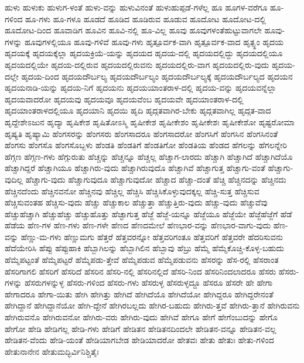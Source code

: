 {ಹುಳು
ಹುಳುಕು
ಹುಳುಗ-ಳಂತೆ
ಹುಳು-ವನ್ನು
ಹುಳುವಿನಂತೆ
ಹುಳುಹುಪ್ಪಡೆ-ಗಳೆಲ್ಲ
ಹೂ
ಹೂಗಳ-ವರೆಗೂ
ಹೂ-ಗಳಿಂದ
ಹೂ-ಗಳು
ಹೂ-ಗಳೂ
ಹೂಡದೆ
ಹೂಡಿದ
ಹೂಡಿರುವ
ಹೂಡುವ
ಹೂದೋಟ
ಹೂದೋಟ-ದಲ್ಲಿ
ಹೂದೋಟ-ದಿಂದ
ಹೂವಾಡಿಗ
ಹೂವಿನ
ಹೂವಿ-ನಲ್ಲಿ
ಹೂ-ವಿಲ್ಲ
ಹೂವು
ಹೂವುಗಳಂತೆಹುಟ್ಟುವಾಗಲೇ
ಹೂವು-ಗಳನ್ನು
ಹೂವುಗಳಲ್ಲಿಯೂ
ಹೂವು-ಗಳಿವೆ
ಹೂವು-ಗಳು
ಹೃತ್ಪೂರ್ವಕ-ವಾಗಿ
ಹೃತ್ಪೂರ್ವಕ-ವಾದ
ಹೃತ್ಸ್ಥಂ
ಹೃದಯ
ಹೃದಯಕ್ಕೆ
ಹೃದಯಕ್ಕೆಲ್ಲಾ
ಹೃದಯಕ್ರಿಯೆ-ಯನ್ನು
ಹೃದಯದ
ಹೃದಯ-ದಲ್ಲಿ
ಹೃದಯದಲ್ಲಿದ್ದು
ಹೃದಯದಲ್ಲಿಯೂ
ಹೃದಯದಲ್ಲಿಯೇ
ಹೃದಯ-ದಲ್ಲಿರುವ
ಹೃದಯದಲ್ಲಿರುವನು
ಹೃದಯದಲ್ಲಿರು-ವಾಗ
ಹೃದಯದಲ್ಲಿರು-ವುದು
ಹೃದಯ-ದಲ್ಲೇ
ಹೃದಯ-ದಿಂದ
ಹೃದಯದೌರ್ಬಲ್ಯ
ಹೃದಯದೌರ್ಬಲ್ಯಂ
ಹೃದಯದೌರ್ಬಲ್ಯಕ್ಕೆ
ಹೃದಯದೌರ್ಬಲ್ಯದ
ಹೃದಯನ
ಹೃದಯನಾಡಿ-ಯನ್ನು
ಹೃದಯ-ನಿಗೆ
ಹೃದಯನು
ಹೃದಯಯಾಂತರಾಳ-ದಲ್ಲಿ
ಹೃದಯ-ವನ್ನು
ಹೃದಯವನ್ನೆಲ್ಲಾ
ಹೃದಯವಾದರೋ
ಹೃದಯವು
ಹೃದಯವೂ
ಹೃದಯವೆಂಬ
ಹೃದಯವೇ
ಹೃದಯಾಂತರಾಳ-ದಲ್ಲಿ
ಹೃದಯಾಂತರಾಳದಲ್ಲಿಯೂ
ಹೃದಯಾನಿ
ಹೃದಯಿ
ಹೃದಿ
ಹೃದ್ಗತವಾಗಿರ-ಬೇಕು
ಹೃದ್ಗತವಾಗಿಲ್ಲ
ಹೃದ್ಗತ-ವಾದ
ಹೃದ್ದೇಶೇಽಜುನ
ಹೃದ್ಯಾ
ಹೃಷಿಕೇಶ
ಹೃಷಿತೋಽಸ್ಮಿ
ಹೃಷೀಕೇಶ
ಹೃಷೀಕೇಶಂ
ಹೃಷೀಕೇಶಃ
ಹೃಷೀಕೇಶೋ
ಹೃಷ್ಟರೋಮಾ
ಹೃಷ್ಯತಿ
ಹೃಷ್ಯಾಮಿ
ಹೆಂಗಸರನ್ನು
ಹೆಂಗಸರು
ಹೆಂಗಸಾದರೂ
ಹೆಂಗಸಾದರೋ
ಹೆಂಗಸಿಗೆ
ಹೆಂಗಸಿನ
ಹೆಂಗಸಿನಂತೆ
ಹೆಂಗಸು
ಹೆಂಗಸೊ
ಹೆಂಗಸೊಬ್ಬಳು
ಹೆಂಡತಿ
ಹೆಂಡತಿಗೆ
ಹೆಂಡತಿಗೋ
ಹೆಂಡತಿಯ
ಹೆಂಡದ
ಹೆಗಲನ್ನು
ಹೆಗಲನ್ನೇರಿ
ಹೆಗ್ಗಣ
ಹೆಗ್ಗಣ-ಗಳು
ಹೆಗ್ಗುರುತು
ಹೆಚ್ಚನ್ನು
ಹೆಚ್ಚನ್ನೂ
ಹೆಚ್ಚಲ್ಲ
ಹೆಚ್ಚಾಗ-ಲಾರದು
ಹೆಚ್ಚಾಗಿ
ಹೆಚ್ಚಾಗಿದೆ
ಹೆಚ್ಚಾಗಿದೆಯೊ
ಹೆಚ್ಚಾಗಿದ್ದರೆ
ಹೆಚ್ಚಾಗಿಯೂ
ಹೆಚ್ಚಾಗಿರು-ವುದು
ಹೆಚ್ಚಾಗಿರುವುದೊ
ಹೆಚ್ಚಾಗಿವೆ
ಹೆಚ್ಚಾಗುತ್ತ
ಹೆಚ್ಚಾಗು-ವಂತೆ
ಹೆಚ್ಚಾಗು-ವುದಿಲ್ಲ
ಹೆಚ್ಚಾಗು-ವುದು
ಹೆಚ್ಚಾಗುವುದೂ
ಹೆಚ್ಚಾಗುವುದೋ
ಹೆಚ್ಚಾದ
ಹೆಚ್ಚಾ-ದಂತೆ
ಹೆಚ್ಚಿ
ಹೆಚ್ಚಿನದನ್ನು
ಹೆಚ್ಚಿನದು
ಹೆಚ್ಚಿನದೆಂದು
ಹೆಚ್ಚಿನವನೋ
ಹೆಚ್ಚಿನವು
ಹೆಚ್ಚಿಲ್ಲ
ಹೆಚ್ಚಿಸಿ
ಹೆಚ್ಚಿಸಿಕೊಳ್ಳುವುದಕ್ಕಲ್ಲ
ಹೆಚ್ಚಿ-ಸುತ್ತ
ಹೆಚ್ಚಿಸುವ
ಹೆಚ್ಚಿಸುವಂತಹ
ಹೆಚ್ಚಿಸು-ವುದು
ಹೆಚ್ಚು
ಹೆಚ್ಚುಕಾಲ
ಹೆಚ್ಚುತ್ತಾ
ಹೆಚ್ಚುತ್ತಿರು-ವುದು
ಹೆಚ್ಚು-ವುದು
ಹೆಚ್ಚುವೆವು
ಹೆಚ್ಚುಹೆಚ್ಚಾಗಿ
ಹೆಚ್ಚುಹೆಚ್ಚು
ಹೆಚ್ಚುಹೊತ್ತು
ಹೆಚ್ಟಾಗುತ್ತ
ಹೆಜ್ಜೆ
ಹೆಜ್ಜೆ-ಯನ್ನೂ
ಹೆಜ್ಜೆಯೂ
ಹೆಜ್ಜೆಯೇ
ಹೆಜ್ಜೆಹೆಜ್ಜೆಗೆ
ಹೆಡೆ
ಹೆಡೆಯ
ಹೆಣ-ಗಳ
ಹೆಣ-ಗಳು
ಹೆಣ-ಗಳೇ
ಹೆಣದ
ಹೆಣದಮೇಲೆ
ಹೆಣಭಾರ-ವನ್ನು
ಹೆಣಭಾರ-ವಾಗು-ವುದು
ಹೆಣ-ವನ್ನು
ಹೆಣ್ಣು-ಮ-ಗಳು
ಹೆಣ್ಣುಮಗು
ಹೆತ್ತರೆ
ಹೆತ್ತವರನ್ನೋ
ಹೆತ್ತವರಿಗಂತೂ
ಹೆತ್ತವರಿಗೆ
ಹೆತ್ತವರೇ
ಹೆದರಿಸುವನು
ಹೆದೆಯೇರಿಸಿ
ಹೆಪ್ಪು
ಹೆಪ್ಪುಹಾಕಿ
ಹೆಬ್ಬಾಗಿಲನ್ನು
ಹೆಬ್ಬಾಗಿಲಿನ
ಹೆಬ್ಬಾವು
ಹೆಬ್ರು
ಹೆಮ್ಮೆ
ಹೆಮ್ಮೆಕೊಚ್ಚಿ-ಕೊಳ್ಳ-ಬಹುದು
ಹೆಮ್ಮೆಪಟ್ಟಂತೆ
ಹೆಮ್ಮೆಪಟ್ಟರೆ
ಹೆಮ್ಮೆಪಡು-ತ್ತೇವೆ
ಹೆಮ್ಮೆಪಡುವ
ಹೆಮ್ಮೆಪಡುವನು
ಹೆಸರನ್ನು
ಹೆಸ-ರಲ್ಲಿ
ಹೆಸರಾಂತ
ಹೆಸರಿಗಾಗಲಿ
ಹೆಸರಿಗೆ
ಹೆಸರಿದೆ
ಹೆಸರಿನ
ಹೆಸರಿ-ನಲ್ಲಿ
ಹೆಸರಿನಲ್ಲಿದೆ
ಹೆಸರಿ-ನಿಂದ
ಹೆಸರಿನಿಂದಲಾದರೂ
ಹೆಸರು
ಹೆಸರು-ಗಳನ್ನು
ಹೆಸರುಗಳನ್ನುಳ್ಳ
ಹೆಸರು-ಗಳಿಂದ
ಹೆಸರು-ಗಳು
ಹೆಸರುಳ್ಳ
ಹೆಸರುಳ್ಳದ್ದೂ
ಹೆಸರೂ
ಹೆಸರೇ
ಹೇ
ಹೇಗಾ
ಹೇಗಾದರೂ
ಹೇಗಾ-ಯಿತು
ಹೇಗಿ
ಹೇಗಿತ್ತು
ಹೇಗಿದೆ
ಹೇಗಿದೆಯೊ
ಹೇಗಿದೆಯೋ
ಹೇಗಿದ್ದರೂ
ಹೇಗಿದ್ದರೇನಂತೆ
ಹೇಗಿದ್ದಾನೆ
ಹೇಗಿದ್ದಾನೆಯೋ
ಹೇಗಿ-ದ್ದೇನೆ
ಹೇಗಿರಬಲ್ಲದು
ಹೇಗಿರ-ಬಹುದು
ಹೇಗಿರು-ತ್ತವೆ
ಹೇಗಿರು-ತ್ತಾನೆ
ಹೇಗಿರುವನು
ಹೇಗಿರುವನೊ
ಹೇಗಿರುವನೋ
ಹೇಗಿರು-ವರು
ಹೇಗಿರು-ವುದು
ಹೇಗಿವೆ
ಹೇಗೂ
ಹೇಗೆ
ಹೇಗೆಂಬುದನ್ನು
ಹೇಗೊ
ಹೇಗೋ
ಹೇಡಿ
ಹೇಡಿಗಲ್ಲ
ಹೇಡಿ-ಗಳು
ಹೇಡಿಗೆ
ಹೇಡಿತನ
ಹೇಡಿತನದಿಂದಲೇ
ಹೇಡಿತನ-ವನ್ನೂ
ಹೇಡಿತನ-ವಲ್ಲ
ಹೇಡಿತನ-ವೆಂದು
ಹೇಡಿ-ಯಂತೆ
ಹೇಡಿಯಾಗಬೇಡ
ಹೇಡಿಯಾದರೋ
ಹೇತವಃ
ಹೇತು
ಹೇತುಃ
ಹೇತು-ಗಳಿಂದ
ಹೇತುನಾನೇನ
ಹೇತುಮದ್ಭಿರ್ವಿನಿಶ್ಚಿತೈಃ
}
